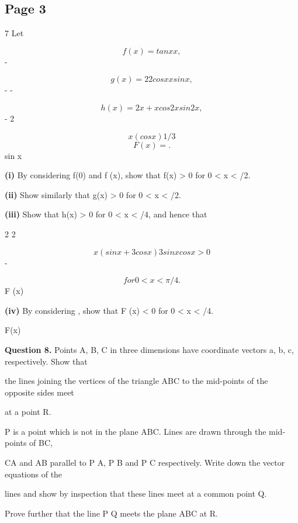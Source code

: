 \documentclass[12pt]{article}
\begin{document}
\subsection*{Page 3}
\begin{flushleft}
7 Let\par
\[f(x) = tan x x,\]
-\par
\[g(x) = 2 2 cos x x sin x,\]
- -\par
\[h(x) = 2x + x cos 2x sin 2x,\]
- 2\par
\[x(cos x)1/3\]
\[F(x) = .\]
sin x\par
\textbf{(i)} By considering f(0) and f (x), show that f(x) > 0 for 0 < x < \pi/2.\par
\textbf{(ii)} Show similarly that g(x) > 0 for 0 < x < \pi/2.\par
\textbf{(iii)} Show that h(x) > 0 for 0 < x < \pi/4, and hence that\par
2 2\par
\[x(sin x + 3 cos x) 3 sin x cos x > 0\]
-\par
\[for 0 < x < \pi/4.\]
F (x)\par
\textbf{(iv)} By considering , show that F (x) < 0 for 0 < x < \pi/4.\par
F(x)\par
\bigskip\textbf{Question 8.} Points A, B, C in three dimensions have coordinate vectors a, b, c, respectively. Show that\par
the lines joining the vertices of the triangle ABC to the mid-points of the opposite sides meet\par
at a point R.\par
P is a point which is not in the plane ABC. Lines are drawn through the mid-points of BC,\par
CA and AB parallel to P A, P B and P C respectively. Write down the vector equations of the\par
lines and show by inspection that these lines meet at a common point Q.\par
Prove further that the line P Q meets the plane ABC at R.\par
\end{flushleft}
\end{document}
